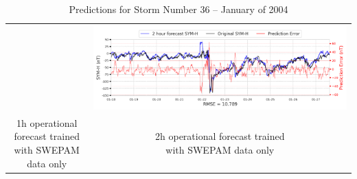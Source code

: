 \documentclass[draft,sw]{agutexSI2019}
\begin{document}
\begin{table}
\begin{tabular}{cc}
&
\includegraphics[width=0.49\linewidth]{paper_plots_shade/2h_swepam_rt/2h_swepam_rt_storm_36.png}
\\
\shortstack{1h operational forecast trained\\ with SWEPAM data only} & \shortstack{2h operational forecast trained\\ with SWEPAM data only}
\vspace*{12pt}
\\
\end{tabular}
\caption{Predictions for Storm Number 36 -- January of 2004}
\label{storm-36}
\end{table}
\end{document}
